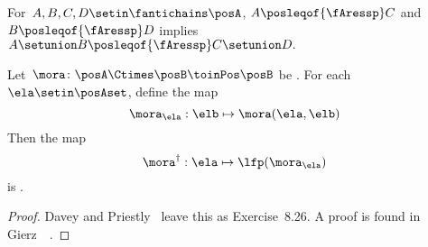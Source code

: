 \begin{lemma}
    \label{lem:antichain_union}
    For~$A,B,C,D\setin\fantichains\posA$, $A\posleqof{\fAressp}C$
    and $B\posleqof{\fAressp}D$ implies $A\setunion B\posleqof{\fAressp}C\setunion D.
    $
\end{lemma}

\begin{lemma}
    \label{lem:dagger}
    Let~$\mora\colon\posA\Ctimes\posB\toinPos\posB$ be \scottcontinuous.
    For each~$\ela\setin\posAset$, define the map
    \begin{equation}
        \mora_{\ela}:\elb\mapsto \mora(\ela,\elb)
    \end{equation}
    Then the map
    \begin{equation}
        \mora^{\dagger}:\ela\mapsto\lfp(\mora_{\ela})
    \end{equation} is \scottcontinuous.
\end{lemma}
\begin{proof}
    Davey and Priestly~\cite{davey02} leave this as Exercise~8.26.
    A proof is found in Gierz~\etal~\cite[Exercise II-2.29]{gierz03continuous}.
\end{proof}

